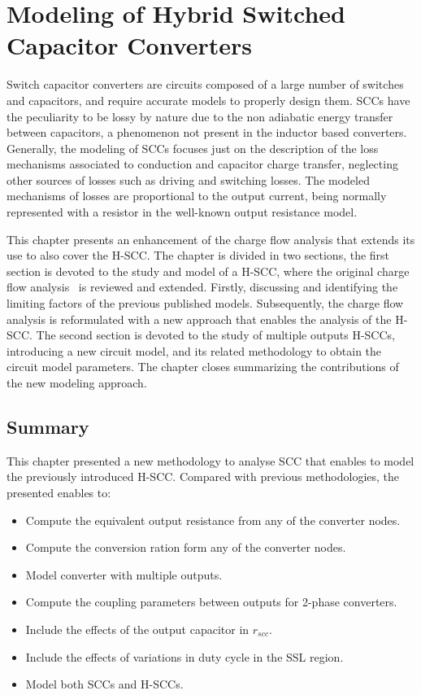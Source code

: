 \chapter[Modeling of H-SCC]{Modeling of Hybrid Switched Capacitor Converters}
\label{ch:modeling}
Switch capacitor converters are circuits composed of a large number of switches and capacitors, and require accurate models to properly design them. SCCs have the peculiarity to be lossy by nature due to the non adiabatic energy transfer between capacitors, a phenomenon not present in the inductor based converters. Generally, the modeling of SCCs focuses just on the description of the loss mechanisms associated to conduction and capacitor charge transfer, neglecting other sources of losses such as driving and switching losses. The modeled mechanisms of losses are proportional to the output current, being  normally represented with a resistor in the well-known output resistance model.

This chapter presents an enhancement of the charge flow analysis that extends its use to also cover the H-SCC.   The chapter is divided in two sections, the first section is devoted to the study and model of a H-SCC, where the original charge flow analysis~\cite{95Makowski,Seeman:EECS-2009-78} is reviewed and extended. Firstly, discussing and identifying the limiting factors of the previous published models. Subsequently, the charge flow analysis is reformulated with a new approach that enables the analysis of the H-SCC. The second section is devoted to the study of multiple outputs H-SCCs, introducing a new circuit model, and its related methodology to obtain the circuit model parameters. The chapter closes summarizing the contributions of the new modeling approach.




\section{Summary}
This chapter presented a new methodology to analyse SCC that enables to model the previously introduced H-SCC. Compared with previous methodologies, the presented enables to:
\begin{itemize}
  \item Compute the equivalent output resistance from any of the converter nodes.
  \item Compute the conversion ration form any of the converter nodes.
  \item Model converter with multiple outputs.
  \item Compute the coupling parameters between outputs for 2-phase converters.
  \item Include the effects of the output capacitor in $r_{scc}$.
  \item Include the effects of variations in duty cycle in the SSL region.
  \item Model both SCCs and H-SCCs.
\end{itemize}


\clearpage

 